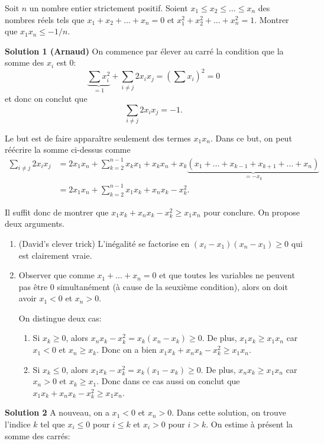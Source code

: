 Soit $n$ un nombre entier strictement positif. Soient $x_1\leq x_2\leq\ldots\leq x_n$ des nombres réels tels que $x_1+x_2+\ldots+x_n=0$ et $x_1^2+x_2^2+\ldots+x_n^2=1$. Montrer que $x_1x_n\leq -1/n$.

\textbf{Solution 1 (Arnaud)}
On commence par élever au carré la condition que la somme des $x_i$ est 0:
\[
\underbrace{\sum x_i^2}_{=1} +\sum_{i\neq j} 2x_ix_j=\left(\sum x_i\right)^2=0
\]
et donc on conclut que 
\[
\sum_{i\neq j}2x_ix_j=-1.
\]

Le but est de faire apparaître seulement des termes $x_1x_n$. Dans ce but, on peut réécrire la somme ci-dessus comme
\begin{align*}
\sum_{i\neq j}2x_ix_j&=2x_1x_n+\sum_{k=2}^{n-1} x_kx_1+x_kx_n+x_k\underbrace{(x_1+\ldots+x_{k-1}+x_{k+1}+\ldots+x_n)}_{=-x_k}\\
&= 2x_1x_n +\sum_{k=2}^{n-1} x_1x_k+x_nx_k-x_k^2.
\end{align*}

Il suffit donc de montrer que $x_1x_k+x_nx_k-x_k^2\geq x_1x_n$ pour conclure. On propose deux arguments.

\begin{enumerate}
    \item (David's clever trick) L'inégalité se factorise en $(x_i-x_1)(x_n-x_1)\geq 0$ qui est clairement vraie.
    \item Observer que comme $x_1+\ldots+x_n=0$ et que toutes les variables ne peuvent pas être 0 simultanément (à cause de la seuxième condition), alors on doit avoir $x_1<0$ et $x_n>0$.

On distingue deux cas:
\begin{enumerate}
    \item Si $x_k\geq 0$, alors $x_nx_k-x_k^2=x_k(x_n-x_k)\geq 0$. De plus, $x_1x_k\geq x_1x_n$ car $x_1<0$ et $x_n\geq x_k$. Donc on a bien $x_1x_k+x_nx_k-x_k^2\geq x_1x_n$.
    
    \item Si $x_k\leq 0$, alors $x_1x_k-x_k^2=x_k(x_1-x_k)\geq 0$. De plus, $x_nx_k\geq x_1x_n$ car $x_n>0$ et $x_k\geq x_1$. Donc dans ce cas aussi on conclut que $x_1x_k+x_nx_k-x_k^2\geq x_1x_n$.
\end{enumerate}
\end{enumerate}

\textbf{Solution 2}
A nouveau, on a $x_1<0$ et $x_n>0$. Dans cette solution, on trouve l'indice $k$ tel que $x_i\leq 0$ pour $i\leq k$ et $x_i>0$ pour $i>k$. On estime à présent la somme des carrés:

